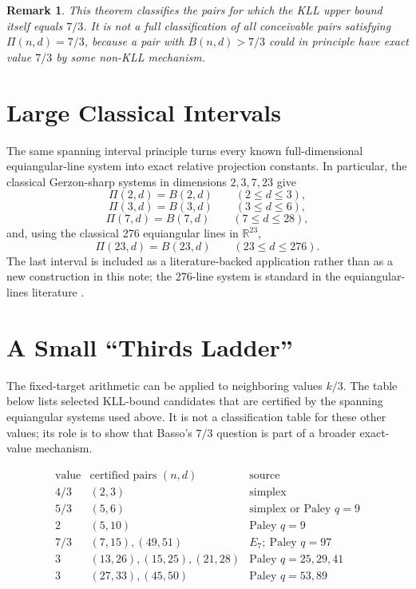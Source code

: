 \documentclass[11pt]{article}
\newtheorem{remark}{Remark}
\newcommand{\R}{\mathbb{R}}
\newcommand{\PiRel}{\Pi}
\newcommand{\Bnd}{B}
\begin{document}
\begin{remark}
This theorem classifies the pairs for which the KLL upper bound itself equals
\(7/3\).  It is not a full classification of all conceivable pairs satisfying
\(\PiRel(n,d)=7/3\), because a pair with \(\Bnd(n,d)>7/3\) could in principle
have exact value \(7/3\) by some non-KLL mechanism.
\end{remark}

\section*{Large Classical Intervals}

The same spanning interval principle turns every known full-dimensional
equiangular-line system into exact relative projection constants.  In
particular, the classical Gerzon-sharp systems in dimensions \(2,3,7,23\)
give
\[
  \PiRel(2,d)=\Bnd(2,d)\qquad(2\le d\le3),
\]
\[
  \PiRel(3,d)=\Bnd(3,d)\qquad(3\le d\le6),
\]
\[
  \PiRel(7,d)=\Bnd(7,d)\qquad(7\le d\le28),
\]
and, using the classical 276 equiangular lines in \(\R^{23}\),
\[
  \PiRel(23,d)=\Bnd(23,d)\qquad(23\le d\le276).
\]
The last interval is included as a literature-backed application rather than
as a new construction in this note; the 276-line system is standard in the
equiangular-lines literature \cite{LS1973,LinYu2018}.

\section*{A Small ``Thirds Ladder''}

The fixed-target arithmetic can be applied to neighboring values \(k/3\).
The table below lists selected KLL-bound candidates that are certified by the
spanning equiangular systems used above.  It is not a classification table
for these other values; its role is to show that Basso's \(7/3\) question is
part of a broader exact-value mechanism.

\[
\begin{array}{c|l|l}
\text{value} & \text{certified pairs }(n,d) & \text{source}\\
\hline
4/3 & (2,3) & \text{simplex}\\
5/3 & (5,6) & \text{simplex or Paley }q=9\\
2 & (5,10) & \text{Paley }q=9\\
7/3 & (7,15),(49,51) & E_7;\ \text{Paley }q=97\\
3 & (13,26),(15,25),(21,28) & \text{Paley }q=25,29,41\\
3 & (27,33),(45,50) & \text{Paley }q=53,89\\
\end{array}
\]
\end{document}
